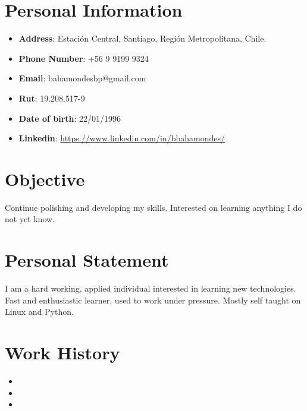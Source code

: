 \documentclass[11pt,a4paper,roman]{moderncv}        %
\begin{document}
\makecvtitle
\vspace*{-15mm}

\section{Personal Information}

\begin{itemize}
\item{\textbf{Address}: Estación Central, Santiago, Región Metropolitana, Chile.}
\item{\textbf{Phone Number}: +56 9 9199 9324}
\item{\textbf{Email}: bahamondesbp@gmail.com}
\item{\textbf{Rut}: 19.208.517-9}
\item{\textbf{Date of birth}: 22/01/1996}
\item{\textbf{Linkedin}: \url{https://www.linkedin.com/in/bbahamondes/}}
\end{itemize}

\section{Objective}
\small{ Continue polishing and developing my skills. Interested on learning anything I do not yet know.  }

\section{Personal Statement}
\small{ I am a hard working, applied individual interested in learning new technologies. Fast and enthusiastic learner, used to work under pressure. Mostly self taught on Linux and Python.}

\section{Work History}
\begin{itemize}
\item{}
\vspace{3pt}
\item{}
\vspace{3pt}
\item{}
\end{itemize}
\end{document}
